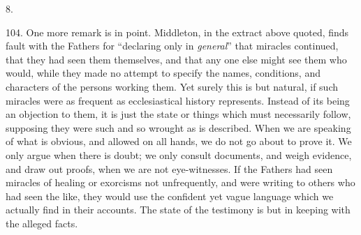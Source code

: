 8.

104.
One more remark is in point. Middleton, in the extract above quoted,
finds fault with the Fathers for ``declaring only in \emph{general}''
that miracles continued, that they had seen them themselves, and that
any one else might see them who would, while they made no attempt to
specify the names, conditions, and characters of the persons working
them. Yet surely this is but natural, if such miracles were as
frequent as ecclesiastical history represents. Instead of its being an
objection to them, it is just the state or things which must
necessarily follow, supposing they were such and so wrought as is
described. When we are speaking of what is obvious, and allowed on all
hands, we do not go about to prove it. We only argue when there is
doubt; we only consult documents, and weigh evidence, and draw out
proofs, when we are not eye-witnesses. If the Fathers had seen
miracles of healing or exorcisms not unfrequently, and were writing to
others who had seen the like, they would use the confident yet vague
language which we actually find in their accounts. The state of the
testimony is but in keeping with the alleged facts.

